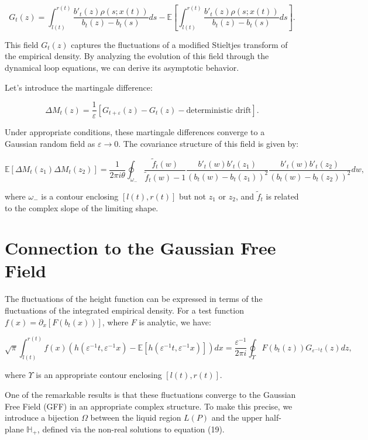 \documentclass[letterpaper,11pt,oneside,reqno]{article}
\numberwithin{equation}{section}
\theoremstyle{definition}
\begin{document}
$$G_t(z) = \int_{l(t)}^{r(t)} \frac{b'_t(z)\rho(s; x(t))}{b_t(z) - b_t(s)}ds - \mathbb{E}\left[\int_{l(t)}^{r(t)} \frac{b'_t(z)\rho(s; x(t))}{b_t(z) - b_t(s)}ds\right].$$

This field $G_t(z)$ captures the fluctuations of a modified Stieltjes transform of the empirical density. By analyzing the evolution of this field through the dynamical loop equations, we can derive its asymptotic behavior.

Let's introduce the martingale difference:

$$\Delta M_t(z) = \frac{1}{\varepsilon}[G_{t+\varepsilon}(z) - G_t(z) - \text{deterministic drift}].$$

Under appropriate conditions, these martingale differences converge to a Gaussian random field as $\varepsilon \to 0$. The covariance structure of this field is given by:

$$\mathbb{E}[\Delta M_t(z_1)\Delta M_t(z_2)] = \frac{1}{2\pi i\theta} \oint_{\omega_-} \frac{\tilde{f}_t(w)}{\tilde{f}_t(w) - 1} \frac{b'_t(w)b'_t(z_1)}{(b_t(w) - b_t(z_1))^2} \frac{b'_t(w)b'_t(z_2)}{(b_t(w) - b_t(z_2))^2}dw,$$

where $\omega_-$ is a contour enclosing $[l(t), r(t)]$ but not $z_1$ or $z_2$, and $\tilde{f}_t$ is related to the complex slope of the limiting shape.

\section{Connection to the Gaussian Free Field}

The fluctuations of the height function can be expressed in terms of the fluctuations of the integrated empirical density. For a test function $f(x) = \partial_x[F(b_t(x))]$, where $F$ is analytic, we have:

$$\sqrt{\pi}\int_{l(t)}^{r(t)} f(x)(h(\varepsilon^{-1}t, \varepsilon^{-1}x) - \mathbb{E}[h(\varepsilon^{-1}t, \varepsilon^{-1}x)])dx = \frac{\varepsilon^{-1}}{2\pi i} \oint_{\Upsilon} F(b_t(z))G_{\varepsilon^{-1}t}(z)dz,$$

where $\Upsilon$ is an appropriate contour enclosing $[l(t), r(t)]$.

One of the remarkable results is that these fluctuations converge to the Gaussian Free Field (GFF) in an appropriate complex structure. To make this precise, we introduce a bijection $\Omega$ between the liquid region $L(P)$ and the upper half-plane $\mathbb{H}_+$, defined via the non-real solutions to equation (19).
\end{document}
